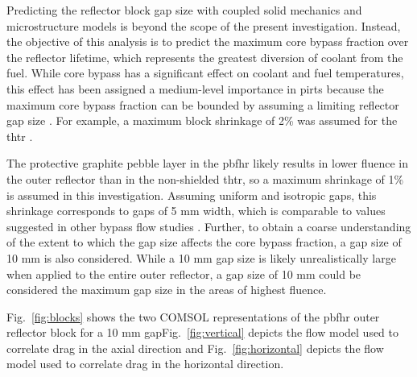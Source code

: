Predicting the reflector block gap size with coupled solid mechanics and microstructure models is beyond the scope of the present investigation. Instead, the objective of this analysis is to predict the maximum core bypass fraction over the reflector lifetime, which represents the greatest diversion of coolant from the fuel. While core bypass has a significant effect on coolant and fuel temperatures, this effect has been assigned a medium-level importance in \glspl{pirt} because the maximum core bypass fraction can be bounded by assuming a limiting reflector gap size \cite{gou_2018}. For example, a maximum block shrinkage of 2\% was assumed for the \gls{thtr} \cite{oehme}.

The protective graphite pebble layer in the \gls{pbfhr} likely results in lower fluence in the outer reflector than in the non-shielded \gls{thtr}, so a maximum shrinkage of 1\% is assumed in this investigation. Assuming uniform and isotropic gaps, this shrinkage corresponds to gaps of 5 \si{\milli\meter} width, which is comparable to values suggested in other bypass flow studies \cite{liu_2018, viljoen,jun2011}. Further, to obtain a coarse understanding of the extent to which the gap size affects the core bypass fraction, a gap size of 10 \si{\milli\meter} is also considered. While a 10 \si{\milli\meter} gap size is likely unrealistically large when applied to the entire outer reflector, a gap size of 10 \si{\milli\meter} could be considered the maximum gap size in the areas of highest fluence.

Fig.\ \ref{fig:blocks} shows the two COMSOL representations of the \gls{pbfhr} outer reflector block for a 10 \si{\milli\meter} gap\mdash Fig.\ \ref{fig:vertical} depicts the flow model used to correlate drag in the axial direction and Fig.\ \ref{fig:horizontal} depicts the flow model used to correlate drag in the horizontal direction. 

